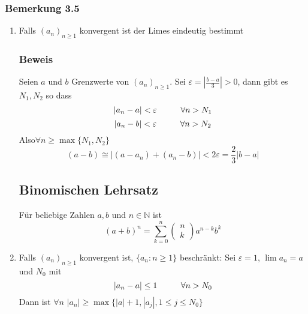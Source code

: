 \subsubsection*{Bemerkung 3.5}
\begin{enumerate}
\item Falls $(a_n)_{n\geq 1}$ konvergent ist der Limes eindeutig bestimmt
\subsubsection*{Beweis}
Seien $a$ und $b$ Grenzwerte von $(a_n)_{n\geq 1}$. Sei $\varepsilon = \left| \frac{b-a}{3}\right|>0$, dann gibt es $N_1,N_2$ so dass $$\left| a_n-a\right| <\varepsilon\hspace{10mm}\forall n>N_1$$$$\left| a_n-b\right| <\varepsilon\hspace{10mm}\forall n>N_2$$
Also$ \forall n\geq \max\{ N_1,N_2\}$ $$(a-b)\cong\left| (a-a_n)+(a_n-b)\right| < 2\varepsilon=\frac{2}{3}\left|b-a\right|$$
\subsection*{Binomischen Lehrsatz}
Für beliebige Zahlen $a,b$ und $n\in\mathbb{N}$ ist \[{\left( {a + b} \right)^n} = \sum\limits_{k = 0}^n {\left( {\begin{array}{*{20}{c}}
n\\
k
\end{array}} \right){a^{n - k}}{b^k}} \]
\item Falls $(a_n)_{n\geq 1}$ konvergent ist, $\{a_n:n\geq 1\}$ beschränkt: Sei $\varepsilon=1$, $\lim a_n=a$ und $N_0$ mit $$\left| a_n-a\right| \leq 1\hspace{10mm} \forall n>N_0$$ Dann ist $\forall n$ $\left| a_n\right| \geq \max\{\left| a\right| +1,\left| a_j\right|, 1\leq j\leq N_0  \}$
\end{enumerate}
